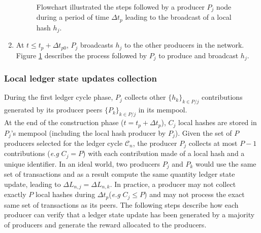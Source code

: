 \begin{enumerate}
\begin{figure}[H]
\label{fig:LLSU}
\caption{\label{fig:LLSU} Flowchart illustrated the steps followed by a producer $P_j$ node during a period of time $\Delta t_{p}$ leading to the broadcast of a local hash $h_j$.}
\end{figure}
\item At $t \leq t_p + \Delta t_{p0}$, $P_j$ broadcasts $h_j$ to the other producers in the network. Figure \ref{fig:LLSU} describes the process followed by $P_j$ to produce and broadcast $h_j$.
\end{enumerate}

\subsubsection{Local ledger state updates collection}

During the first ledger cycle phase, $P_j$ collects other $\{h_k\}_{k \in P/j}$ contributions generated by its producer peers $\{P_k\}_{k \in P/j}$ in its mempool. \\

At the end of the construction phase ($t = t_p + \Delta t_{p}$), $C_j$ local hashes are stored in $P_j$'s mempool (including the local hash producer by $P_j$). Given the set of $P$ producers selected for the ledger cycle $\mathcal{C}_n$, the producer $P_j$ collects at most $P - 1$ contributions (\textit{e.g} $C_j = P$) with each contribution made of a local hash and a unique identifier. In an ideal world, two producers $P_j$ and $P_k$ would use the same set of transactions and as a result compute the same quantity ledger state update, leading to $\Delta L_{n,j} = \Delta L_{n,k}$. In practice, a producer may not collect exactly $P$ local hashes during $\Delta t_{p}$(\textit{e.g} $C_j \leq P$) and may not process the exact same set of transactions as its peers. The following steps describe how each producer can verify that a ledger state update has been generated by a majority of producers and generate the reward allocated to the producers. 


